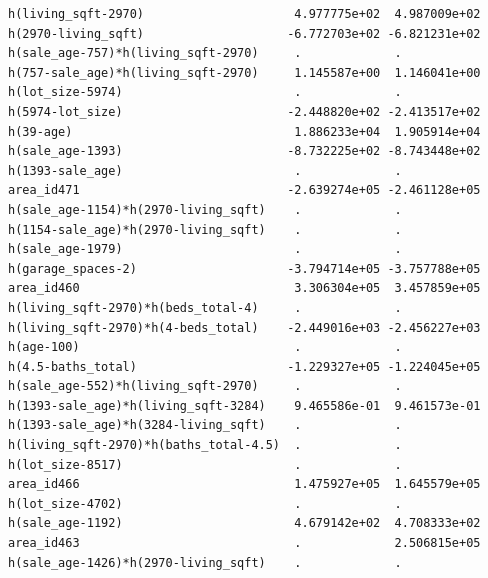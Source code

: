 \documentclass[
]{article}
\begin{document}
\begin{verbatim}
h(living_sqft-2970)                     4.977775e+02  4.987009e+02
h(2970-living_sqft)                    -6.772703e+02 -6.821231e+02
h(sale_age-757)*h(living_sqft-2970)     .             .           
h(757-sale_age)*h(living_sqft-2970)     1.145587e+00  1.146041e+00
h(lot_size-5974)                        .             .           
h(5974-lot_size)                       -2.448820e+02 -2.413517e+02
h(39-age)                               1.886233e+04  1.905914e+04
h(sale_age-1393)                       -8.732225e+02 -8.743448e+02
h(1393-sale_age)                        .             .           
area_id471                             -2.639274e+05 -2.461128e+05
h(sale_age-1154)*h(2970-living_sqft)    .             .           
h(1154-sale_age)*h(2970-living_sqft)    .             .           
h(sale_age-1979)                        .             .           
h(garage_spaces-2)                     -3.794714e+05 -3.757788e+05
area_id460                              3.306304e+05  3.457859e+05
h(living_sqft-2970)*h(beds_total-4)     .             .           
h(living_sqft-2970)*h(4-beds_total)    -2.449016e+03 -2.456227e+03
h(age-100)                              .             .           
h(4.5-baths_total)                     -1.229327e+05 -1.224045e+05
h(sale_age-552)*h(living_sqft-2970)     .             .           
h(1393-sale_age)*h(living_sqft-3284)    9.465586e-01  9.461573e-01
h(1393-sale_age)*h(3284-living_sqft)    .             .           
h(living_sqft-2970)*h(baths_total-4.5)  .             .           
h(lot_size-8517)                        .             .           
area_id466                              1.475927e+05  1.645579e+05
h(lot_size-4702)                        .             .           
h(sale_age-1192)                        4.679142e+02  4.708333e+02
area_id463                              .             2.506815e+05
h(sale_age-1426)*h(2970-living_sqft)    .             .           
                                                                  

\end{verbatim}
\end{document}
